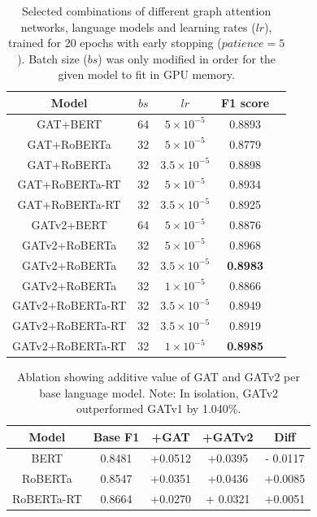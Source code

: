 \documentclass[letterpaper]{article} %
\begin{document}
\begin{table}
    \begin{tabular}{|c|c|c|c|c|}
        \hline
        \hline 
        Model & $bs$ & $lr$ & F1 score \\
        \hline
        GAT+BERT & 64 & $5\times10^{-5}$ &  0.8893 \\
        GAT+RoBERTa & 32 & $5\times10^{-5}$ &  0.8779 \\
        GAT+RoBERTa & 32 & $3.5\times10^{-5}$ &  0.8898 \\
        GAT+RoBERTa-RT & 32 & $5\times10^{-5}$  & 0.8934 \\
        GAT+RoBERTa-RT & 32 & $3.5\times10^{-5}$  & 0.8925 \\
        GATv2+BERT & 64 & $5\times10^{-5}$  & 0.8876 \\
        GATv2+RoBERTa & 32 & $5\times10^{-5}$ &  0.8968 \\
        GATv2+RoBERTa & 32 & $3.5\times10^{-5}$ &  \textbf{0.8983} \\
        GATv2+RoBERTa & 32 & $1\times10^{-5}$ &  0.8866 \\
        GATv2+RoBERTa-RT & 32 & $3.5\times10^{-5}$  & 0.8949 \\
        GATv2+RoBERTa-RT & 32 & $3.5\times10^{-5}$  & 0.8919 \\
        GATv2+RoBERTa-RT & 32 & $1\times10^{-5}$  & \textbf{0.8985} \\
        \hline
    \end{tabular}
    \caption{Selected combinations of different graph attention networks, language models and learning rates ($lr$), trained for 20 epochs with early stopping ($patience=5$). Batch size ($bs$) was only modified in order for the given model to fit in GPU memory.}
\end{table}


\begin{table}
    \begin{tabular}{|c|c|c|c|c|}
        \hline
        \hline 
        Model & Base F1 & +GAT & +GATv2 & Diff \\
        \hline
        BERT & 0.8481 & +0.0512 &  +0.0395 & - 0.0117\\
        RoBERTa & 0.8547 & +0.0351 & +0.0436 & +0.0085\\
        RoBERTa-RT & 0.8664 & +0.0270 & + 0.0321 & +0.0051 \\
        \hline
    \end{tabular}
    \caption{Ablation showing additive value of GAT and GATv2 per base language model. Note: In isolation, GATv2 outperformed GATv1 by 1.040\%.}
\end{table}
\end{document}
